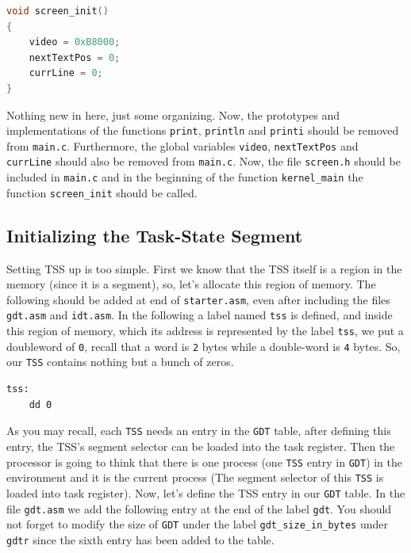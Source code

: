 \begin{lstlisting}[language=C]
void screen_init()
{
    video = 0xB8000;
    nextTextPos = 0;
    currLine = 0;
}
\end{lstlisting}

Nothing new in here, just some organizing. Now, the prototypes and
implementations of the functions \lstinline!print!, \lstinline!println!
and \lstinline!printi! should be removed from \lstinline!main.c!.
Furthermore, the global variables \lstinline!video!,
\lstinline!nextTextPos! and \lstinline!currLine! should also be removed
from \lstinline!main.c!. Now, the file \lstinline!screen.h! should be
included in \lstinline!main.c! and in the beginning of the function
\lstinline!kernel_main! the function \lstinline!screen_init! should be
called.

\subsection{Initializing the Task-State
Segment}\label{initializing-the-task-state-segment}

Setting TSS up is too simple. First we know that the TSS itself is a
region in the memory (since it is a segment), so, let's allocate this
region of memory. The following should be added at end of
\lstinline!starter.asm!, even after including the files
\lstinline!gdt.asm! and \lstinline!idt.asm!. In the following a label
named \lstinline!tss! is defined, and inside this region of memory,
which its address is represented by the label \lstinline!tss!, we put a
doubleword of \lstinline!0!, recall that a word is \lstinline!2! bytes
while a double-word is \lstinline!4! bytes. So, our \lstinline!TSS!
contains nothing but a bunch of zeros.

\begin{lstlisting}
tss:
    dd 0
\end{lstlisting}

As you may recall, each \lstinline!TSS! needs an entry in the
\lstinline!GDT! table, after defining this entry, the TSS's segment
selector can be loaded into the task register. Then the processor is
going to think that there is one process (one \lstinline!TSS! entry in
\lstinline!GDT!) in the environment and it is the current process (The
segment selector of this \lstinline!TSS! is loaded into task register).
Now, let's define the TSS entry in our \lstinline!GDT! table. In the
file \lstinline!gdt.asm! we add the following entry at the end of the
label \lstinline!gdt!. You should not forget to modify the size of
\lstinline!GDT! under the label \lstinline!gdt_size_in_bytes! under
\lstinline!gdtr! since the sixth entry has been added to the table.

